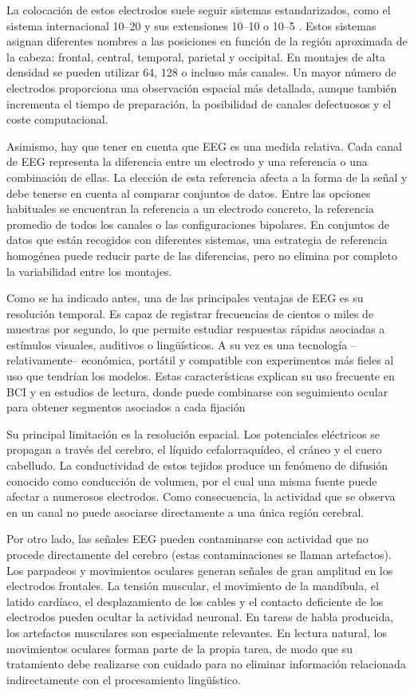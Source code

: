 La colocación de estos electrodos suele seguir sistemas estandarizados, como el sistema internacional 10--20 y sus extensiones 10--10 o 10--5 \cite{jasper1958ten, oostenveld2001five}. Estos sistemas asignan diferentes nombres a las posiciones en función de la región aproximada de la cabeza: frontal, central, temporal, parietal y occipital. En montajes de alta densidad se pueden utilizar 64, 128 o incluso más canales. Un mayor número de electrodos proporciona una observación espacial más detallada, aunque también incrementa el tiempo de preparación, la posibilidad de canales defectuosos y el coste computacional.

Asimismo, hay que tener en cuenta que EEG es una medida relativa. Cada canal de EEG representa la diferencia entre un electrodo y una referencia o una combinación de ellas. La elección de esta referencia afecta a la forma de la señal y debe tenerse en cuenta al comparar conjuntos de datos. Entre las opciones habituales se encuentran la referencia a un electrodo concreto, la referencia promedio de todos los canales o las configuraciones bipolares. En conjuntos de datos que están recogidos con diferentes sistemas, una estrategia de referencia homogénea puede reducir parte de las diferencias, pero no elimina por completo la variabilidad entre los montajes.

Como se ha indicado antes, una de las principales ventajas de EEG es su resolución temporal. Es capaz de registrar frecuencias de cientos o miles de muestras por segundo, lo que permite estudiar respuestas rápidas asociadas a estímulos visuales, auditivos o lingüísticos. A su vez es una tecnología --relativamente-- económica, portátil y compatible con experimentos más fieles al uso que tendrían los modelos. Estas características explican su uso frecuente en BCI y en estudios de lectura, donde puede combinarse con seguimiento ocular para obtener segmentos asociados a cada fijación \cite{hollenstein2020zuco2}

Su principal limitación es la resolución espacial. Los potenciales eléctricos se propagan a través del cerebro, el líquido cefalorraquídeo, el cráneo y el cuero cabelludo. La conductividad de estos tejidos produce un fenómeno de difusión conocido como conducción de volumen, por el cual una misma fuente puede afectar a numerosos electrodos. Como consecuencia, la actividad que se observa en un canal no puede asociarse directamente a una única región cerebral.

Por otro lado, las señales EEG pueden contaminarse con actividad que no procede directamente del cerebro (estas contaminaciones se llaman artefactos). Los parpadeos y movimientos oculares generan señales de gran amplitud en los electrodos frontales. La tensión muscular, el movimiento de la mandíbula, el latido cardíaco, el desplazamiento de los cables y el contacto deficiente de los electrodos pueden ocultar la actividad neuronal. En tareas de habla producida, los artefactos musculares son especialmente relevantes. En lectura natural, los movimientos oculares forman parte de la propia tarea, de modo que su tratamiento debe realizarse con cuidado para no eliminar información relacionada indirectamente con el procesamiento lingüístico.

